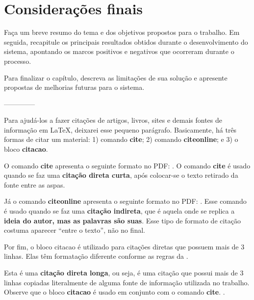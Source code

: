 \chapter{Considerações finais}

Faça um breve resumo do tema e dos objetivos propostos para o trabalho. Em seguida, recapitule os principais resultados obtidos durante o desenvolvimento do sistema, apontando os marcos positivos e negativos que ocorreram durante o processo.

Para finalizar o capítulo, descreva as limitações de sua solução e apresente propostas de melhorias futuras para o sistema.

--------------

Para ajudá-los a fazer citações de artigos, livros, sites e demais fontes de informação em LaTeX, deixarei esse pequeno parágrafo. Basicamente, há três formas de citar um material: 1) comando \textbf{cite}; 2) comando \textbf{citeonline}; e 3) o bloco \textbf{citacao}. 

O comando \textbf{cite} apresenta o seguinte formato no PDF: \cite[p. 23]{abntex2-wiki-como-customizar}. O comando \textbf{cite} é usado quando se faz uma \textbf{citação direta curta}, após colocar-se o texto retirado da fonte entre as aspas.

Já o comando \textbf{citeonline} apresenta o seguinte formato no PDF: . Esse comando é usado quando se faz uma \textbf{citação indireta}, que é aquela onde se replica a \textbf{ideia do autor, mas as palavras são suas}. Esse tipo de formato de citação costuma aparecer ``entre o texto'', não no final.

Por fim, o bloco citacao é utilizado para citações diretas que possuem mais de 3 linhas. Elas têm formatação diferente conforme as regras da .

\begin{citacao}
    Esta é uma \textbf{citação direta longa}, ou seja, é uma citação que possui mais de 3 linhas copiadas literalmente de alguma fonte de informação utilizada no trabalho. Observe que o bloco \textbf{citacao} é usado em conjunto com o comando \textbf{cite}. \cite[p. 11]{abntex2-wiki-como-customizar}.
\end{citacao}